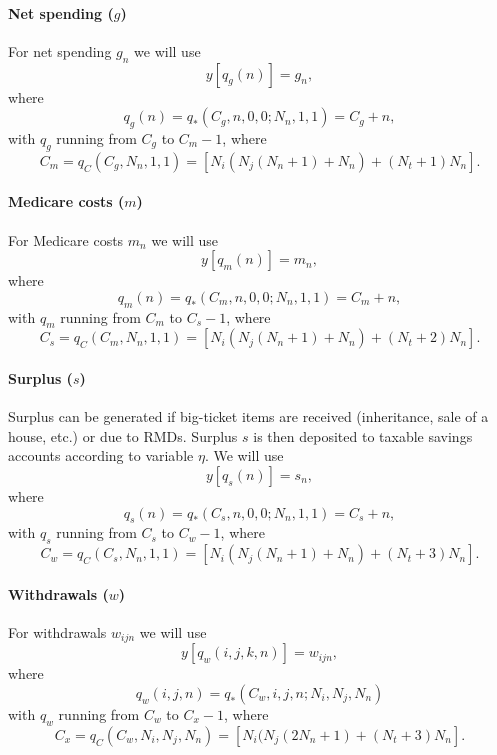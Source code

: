 \documentclass{report}[fleqn,11pt]
\begin{document}
\paragraph*{Net spending (\boldmath$g$)}
For net spending $g_{n}$ we will use
\begin{equation}
	y[q_g(n)] = g_{n},
\end{equation}
where
\begin{equation}
	q_g(n) = q_*(C_g, n, 0, 0; N_n, 1, 1) = C_g + n,
\end{equation}
with $q_g$ running from $C_g$ to $C_m - 1$, where
\[
	C_m = q_C(C_g, N_n, 1, 1) = [N_i(N_j(N_n+1) + N_n) + (N_t + 1) N_n].
\]

\paragraph*{Medicare costs (\boldmath$m$)}
For Medicare costs $m_{n}$ we will use
\begin{equation}
	y[q_m(n)] = m_{n},
\end{equation}
where
\begin{equation}
	q_m(n) = q_*(C_m, n, 0, 0; N_n, 1, 1) = C_m + n,
\end{equation}
with $q_m$ running from $C_m$ to $C_s - 1$, where
\[
	C_s = q_C(C_m, N_n, 1, 1) = [N_i(N_j(N_n+1) + N_n) + (N_t + 2) N_n].
\]

\paragraph*{Surplus (\boldmath$s$)}
Surplus can be generated if big-ticket items are received (inheritance, sale of a house, etc.)
or due to RMDs. Surplus $s$ is then deposited to taxable savings accounts according
to variable $\eta$. We will use
\begin{equation}
	y[q_s(n)] = s_{n},
\end{equation}
where
\begin{equation}
	q_s(n) = q_*(C_s, n, 0, 0; N_n, 1, 1) = C_s + n,
\end{equation}
with $q_s$ running from $C_s$ to $C_w - 1$, where
\[
	C_w = q_C(C_s, N_n, 1, 1) = [N_i(N_j(N_n+1) + N_n) + (N_t + 3) N_n].
\]

\paragraph*{Withdrawals (\boldmath$w$)}
For withdrawals $w_{ijn}$ we will use
\begin{equation}
	y[q_w(i, j, k, n)] = w_{i j n},
\end{equation}
where
\begin{equation}
	q_w(i, j, n) = q_*(C_w, i, j, n; N_i, N_j, N_n)
\end{equation}
with $q_w$ running from $C_w$ to $C_x - 1$, where
\[
	C_x = q_C(C_w, N_i, N_j, N_n) = [N_i(N_j(2N_n + 1) + (N_t + 3) N_n].
\]
\end{document}
